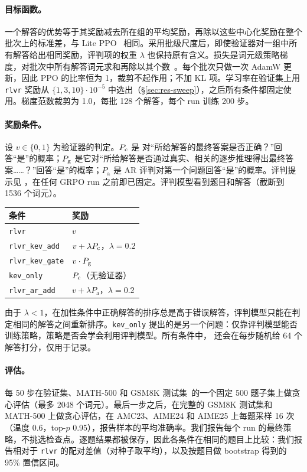 \paragraph{目标函数。} 一个解答的优势等于其奖励减去所在组的平均奖励，再除以这些中心化奖励在整个批次上的标准差，与 Lite PPO~\cite{liu2026tricks} 相同。采用批级尺度后，即使验证器对一组中所有解答给出相同奖励，评判项的权重 $\lambda$ 也保持原有含义。损失是词元级策略梯度，对批次中所有解答词元求和再除以其个数~\cite{liu2025understanding}。每个批次只做一次 AdamW 更新，因此 PPO 的比率恒为 1，裁剪不起作用；不加 KL 项。学习率在验证集上用 \texttt{rlvr} 奖励从 $\{1,3,10\}\cdot10^{-5}$ 中选出（\S\ref{sec:res-sweep}），之后所有条件都固定使用。梯度范数裁剪为 1.0，每批 128 个解答，每个 run 训练 200 步。

\paragraph{奖励条件。} 设 $v\in\{0,1\}$ 为验证器的判定。$P_{\mathrm{c}}$ 是 \kev{} 对“所给解答的最终答案是否正确？”回答“是”的概率；$P_{\mathrm{g}}$ 是它对“所给解答是否通过真实、相关的逐步推理得出最终答案……？”回答“是”的概率；$P_{\mathrm{a}}$ 是 AR 评判对第一个问题回答“是”的概率。评判提示见 ，在任何 GRPO run 之前即已固定。评判模型看到题目和解答（截断到 1536 个词元）。
\begin{center}\small
\begin{tabular}{@{}ll@{}}
\toprule
条件 & 奖励 \\ \midrule
\texttt{rlvr} & $v$ \\
\texttt{rlvr\_kev\_add} & $v+\lambda P_{\mathrm{c}}$，$\lambda=0.2$ \\
\texttt{rlvr\_kev\_gate} & $v\cdot P_{\mathrm{g}}$ \\
\texttt{kev\_only} & $P_{\mathrm{c}}$（无验证器） \\
\texttt{rlvr\_ar\_add} & $v+\lambda P_{\mathrm{a}}$，$\lambda=0.2$ \\ \bottomrule
\end{tabular}
\end{center}
由于 $\lambda<1$，在加性条件中正确解答的排序总是高于错误解答，评判模型只能在判定相同的解答之间重新排序。\texttt{kev\_only} 提出的是另一个问题：仅靠评判模型能否训练策略，策略是否会学会利用评判模型。所有条件中，\kev{} 还会在每步随机给 64 个解答打分，仅用于记录。

\paragraph{评估。} 每 50 步在验证集、MATH-500 和 GSM8K 测试集~\cite{cobbe2021gsm8k}的一个固定 500 题子集上做贪心评估（最多 2048 个词元）。最后一步之后，在完整的 GSM8K 测试集和 MATH-500 上做贪心评估，在 AMC23、AIME24 和 AIME25 上每题采样 16 次（温度 0.6，top-$p$ 0.95），报告样本的平均准确率。我们报告每个 run 的最终策略，不挑选检查点。逐题结果都被保存，因此各条件在相同的题目上比较：我们报告相对于 \texttt{rlvr} 的配对差值（对种子取平均），以及按题目做 bootstrap 得到的 95\% 置信区间。

